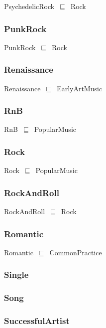 \documentclass{article}
\begin{document}
PsychedelicRock~\ensuremath{\sqsubseteq}~Rock~

\subsubsection*{PunkRock}

PunkRock~\ensuremath{\sqsubseteq}~Rock~

\subsubsection*{Renaissance}

Renaissance~\ensuremath{\sqsubseteq}~EarlyArtMusic~

\subsubsection*{RnB}

RnB~\ensuremath{\sqsubseteq}~PopularMusic~

\subsubsection*{Rock}

Rock~\ensuremath{\sqsubseteq}~PopularMusic~

\subsubsection*{RockAndRoll}

RockAndRoll~\ensuremath{\sqsubseteq}~Rock~

\subsubsection*{Romantic}

Romantic~\ensuremath{\sqsubseteq}~CommonPractice~

\subsubsection*{Single}

\subsubsection*{Song}

\subsubsection*{SuccessfulArtist}
\end{document}
